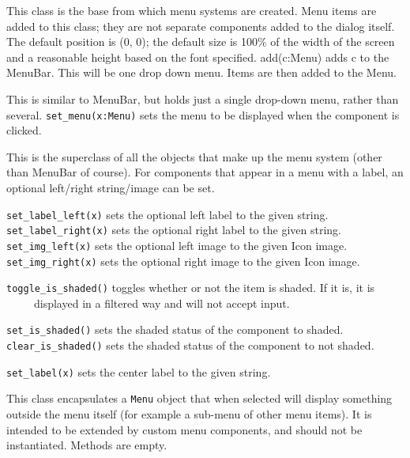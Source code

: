 This class is the base from which menu systems are created. Menu items
are added to this class; they are not separate components added to the
dialog itself. The default position is (0, 0); the default size is
100\% of the width of the screen and a reasonable height based on the
font specified. add(c:Menu) adds c to the MenuBar. This will be one
drop down menu. Items are then added to the Menu.


This is similar to MenuBar, but holds just a single drop-down menu,
rather than several. \texttt{set\_menu(x:Menu)} sets the menu to be displayed
when the component is clicked.


This is the superclass of all the objects that make up the menu system
(other than MenuBar of course). For components that appear in a menu
with a label, an optional left/right string/image can be set.

\texttt{set\_label\_left(x)} sets the optional left label to the given
string.\\
\texttt{set\_label\_right(x)} sets the optional right label to the given
string.\\
\texttt{set\_img\_left(x)} sets the optional left image to the given Icon
image.\\
\texttt{set\_img\_right(x)} sets the optional right image to the given Icon
image.

\texttt{toggle\_is\_shaded()} toggles whether or not the item is shaded. If it
is, it is\\
 \ \ \ \ \ displayed in a filtered way and will not accept input.

\texttt{set\_is\_shaded()} sets the shaded status of the component to
shaded.\\
\texttt{clear\_is\_shaded()} sets the shaded status of the component to not
shaded.

\texttt{set\_label(x)} sets the center label to the given string.


This class encapsulates a \texttt{Menu} object that when selected will
display something outside the menu itself (for example a sub-menu of
other menu items). It is intended to be extended by custom menu
components, and should not be instantiated. Methods are empty.

